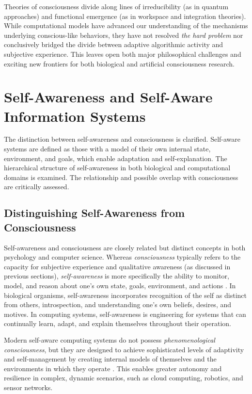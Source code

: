 Theories of consciousness divide along lines of irreducibility (as in quantum approaches) and functional emergence (as in workspace and integration theories). While computational models have advanced our understanding of the mechanisms underlying conscious-like behaviors, they have not resolved \emph{the hard problem} nor conclusively bridged the divide between adaptive algorithmic activity and subjective experience. This leaves open both major philosophical challenges and exciting new frontiers for both biological and artificial consciousness research.

\section{Self-Awareness and Self-Aware Information Systems}

The distinction between self-awareness and consciousness is clarified. Self-aware systems are defined as those with a model of their own internal state, environment, and goals, which enable adaptation and self-explanation. The hierarchical structure of self-awareness in both biological and computational domains is examined. The relationship and possible overlap with consciousness are critically assessed.

\subsection{Distinguishing Self-Awareness from Consciousness}

Self-awareness and consciousness are closely related but distinct concepts in both psychology and computer science. Whereas \emph{consciousness} typically refers to the capacity for subjective experience and qualitative awareness (as discussed in previous sections), \emph{self-awareness} is more specifically the ability to monitor, model, and reason about one's own state, goals, environment, and actions \cite{kounev2017notion,lewis2016self}. In biological organisms, self-awareness incorporates recognition of the self as distinct from others, introspection, and understanding one's own beliefs, desires, and motives. In computing systems, self-awareness is engineering for systems that can continually learn, adapt, and explain themselves throughout their operation.

Modern self-aware computing systems do not possess \emph{phenomenological consciousness}, but they are designed to achieve sophisticated levels of adaptivity and self-management by creating internal models of themselves and the environments in which they operate \cite{kounev2017self,lewis2016self}. This enables greater autonomy and resilience in complex, dynamic scenarios, such as cloud computing, robotics, and sensor networks.

